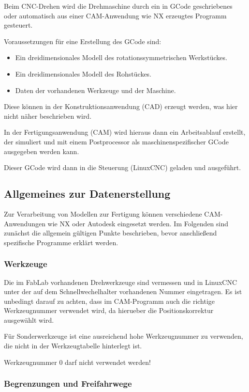 \documentclass{\basedir/fablab-document}
\begin{document}
Beim CNC-Drehen wird die Drehmaschine durch ein in GCode geschriebenes oder automatisch aus einer CAM-Anwendung wie NX erzeugtes Programm gesteuert.

Voraussetzungen für eine Erstellung des GCode sind:
\begin{itemize}
	\item Ein dreidimensionales Modell des rotationssymmetrischen Werkstückes.
	\item Ein dreidimensionales Modell des Rohstückes.
	\item Daten der vorhandenen Werkzeuge und der Maschine.
\end{itemize}
Diese können in der Konstruktionsanwendung (CAD) erzeugt werden, was hier nicht näher beschrieben wird.

In der Fertigungsanwendung (CAM) wird hieraus dann ein Arbeitsablauf erstellt, der simuliert und mit einem Postprocessor als maschinenspezifischer GCode ausgegeben werden kann.

Dieser GCode wird dann in die Steuerung (LinuxCNC) geladen und ausgeführt.

\subsection{Allgemeines zur Datenerstellung}

Zur Verarbeitung von Modellen zur Fertigung können verschiedene CAM-Anwendungen wie NX oder Autodesk eingesetzt werden. Im Folgenden sind zunächst die allgemein gültigen Punkte beschrieben, bevor anschließend spezifische Programme erklärt werden.

\subsubsection{Werkzeuge}

Die im FabLab vorhandenen Drehwerkzeuge sind vermessen und in LinuxCNC unter der auf dem Schnellwechelhalter vorhandenen Nummer eingetragen. Es ist unbedingt darauf zu achten, dass im CAM-Programm auch die richtige Werkzeugnummer verwendet wird, da hierueber die Positionskorrektur ausgewählt wird.

Für Sonderwerkzeuge ist eine ausreichend hohe Werkzeugnummer zu verwenden, die nicht in der Werkzeugtabelle hinterlegt ist.

Werkzeugnummer 0 darf nicht verwendet werden!

\subsubsection{Begrenzungen und Freifahrwege}
\end{document}
